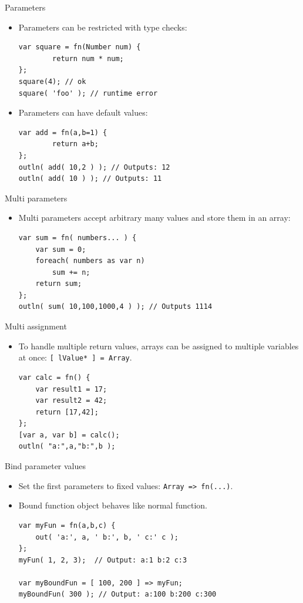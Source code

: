 \documentclass[ucs,9pt]{beamer}
\begin{document}
\begin{frame}[fragile]{Parameters}
	\begin{itemize}
	\item Parameters can be restricted with type checks:
		\begin{lstlisting}
var square = fn(Number num) {
		return num * num;
};
square(4); // ok
square( 'foo' ); // runtime error
		\end{lstlisting}
	\pause
	\item Parameters can have default values:
		\begin{lstlisting}
var add = fn(a,b=1) {
		return a+b;
};
outln( add( 10,2 ) ); // Outputs: 12
outln( add( 10 ) ); // Outputs: 11
		\end{lstlisting}
	\end{itemize}
\end{frame}

\begin{frame}[fragile]{Multi parameters}
	\begin{itemize}
	\item Multi parameters accept arbitrary many values and store them in an array:
		\begin{lstlisting}
var sum = fn( numbers... ) {
	var sum = 0;
	foreach( numbers as var n)
		sum += n;
	return sum;
};
outln( sum( 10,100,1000,4 ) ); // Outputs 1114
		\end{lstlisting}
		\end{itemize}
\end{frame}

\begin{frame}[fragile]{Multi assignment}
	\begin{itemize}
	\item To handle multiple return values, arrays can be assigned to multiple variables at once: 
	 \lstinline![ lValue* ] = Array!.
		\begin{lstlisting}
var calc = fn() {
	var result1 = 17;
	var result2 = 42;
	return [17,42];
};
[var a, var b] = calc();
outln( "a:",a,"b:",b );
		\end{lstlisting}
		\end{itemize}
\end{frame}


\begin{frame}[fragile]{Bind parameter values}
	\begin{itemize}
	\item Set the first parameters to fixed values: \lstinline!Array => fn(...)!.
	\item Bound function object behaves like normal function.
		\begin{lstlisting}
var myFun = fn(a,b,c) {
    out( 'a:', a, ' b:', b, ' c:' c );
};
myFun( 1, 2, 3);  // Output: a:1 b:2 c:3

var myBoundFun = [ 100, 200 ] => myFun;
myBoundFun( 300 ); // Output: a:100 b:200 c:300
		\end{lstlisting}
		\end{itemize}
\end{frame}
\end{document}
